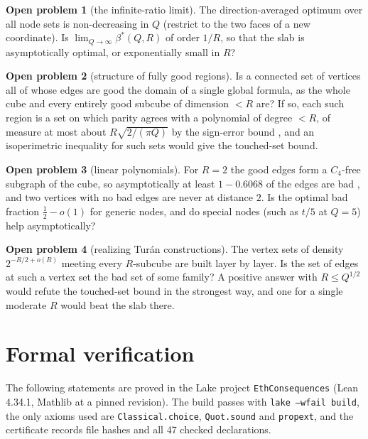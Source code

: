 \documentclass[11pt]{article}
\theoremstyle{definition}
\newtheorem{problem}{Open problem}
\theoremstyle{remark}
\begin{document}
\begin{problem}[the infinite-ratio limit]
The direction-averaged optimum over all node sets is non-decreasing in $Q$ (restrict to the two faces of a new coordinate). Is $\lim_{Q\to\infty}\beta^*(Q,R)$ of order $1/R$, so that the slab is asymptotically optimal, or exponentially small in $R$?
\end{problem}

\begin{problem}[structure of fully good regions]
Is a connected set of vertices all of whose edges are good the domain of a single global formula, as the whole cube and every entirely good subcube of dimension $<R$ are? If so, each such region is a set on which parity agrees with a polynomial of degree $<R$, of measure at most about $R\sqrt{2/(\pi Q)}$ by the sign-error bound \cite{abfr}, and an isoperimetric inequality for such sets would give the touched-set bound.
\end{problem}

\begin{problem}[linear polynomials]
For $R=2$ the good edges form a $C_4$-free subgraph of the cube, so asymptotically at least $1-0.6068$ of the edges are bad \cite{bhll}, and two vertices with no bad edges are never at distance $2$. Is the optimal bad fraction $\frac12-o(1)$ for generic nodes, and do special nodes (such as $t/5$ at $Q=5$) help asymptotically?
\end{problem}

\begin{problem}[realizing Tur\'an constructions]
The vertex sets of density $2^{-R/2+o(R)}$ meeting every $R$-subcube \cite{alon,eil} are built layer by layer. Is the set of edges at such a vertex set the bad set of some family? A positive answer with $R\le Q^{1/2}$ would refute the touched-set bound in the strongest way, and one for a single moderate $R$ would beat the slab there.
\end{problem}

\section{Formal verification}\label{sec:lean}

The following statements are proved in the Lake project \texttt{EthConsequences} (Lean 4.34.1, Mathlib at a pinned revision). The build passes with \texttt{lake --wfail build}, the only axioms used are \texttt{Classical.choice}, \texttt{Quot.sound} and \texttt{propext}, and the certificate records file hashes and all 47 checked declarations.
\end{document}
